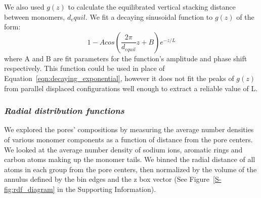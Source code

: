 \documentclass[journal=jpcbfk,manusciprt=article]{achemso}
\begin{document}
  We also used $g(z)$ to calculate the equilibrated vertical stacking distance between
  monomers, $\mathit{d}_equil$. 
  We fit a decaying sinusoidal function to $g(z)$ of the form:
  \begin{equation}
  	1 - Acos(\frac{2\pi}{\mathit{d}_{equil}}z + B)e^{-z/L}
  	\label{eqn:decaying_sinusoid}
  \end{equation}
  where A and B are fit parameters for the function's amplitude and phase shift respectively.
  This function could be used in place of Equation~\ref{eqn:decaying_exponential}, however
  it does not fit the peaks of $g(z)$ from parallel displaced configurations well enough
  to extract a reliable value of L.





  \subsubsection{\textit{Radial distribution functions}}

  We explored the pores' compositions by measuring the average number densities
  of various monomer components as a function of distance from the pore centers.
  We looked at the average number density of sodium ions, aromatic rings and 
  carbon atoms making up the monomer tails. We binned the radial distance of all
  atoms in each group from the pore centers, then normalized by the volume of the
  annulus defined by the bin edges and the z box vector (See Figure~\ref{S-fig:rdf_diagram}
  in the Supporting Information). 
\end{document}

